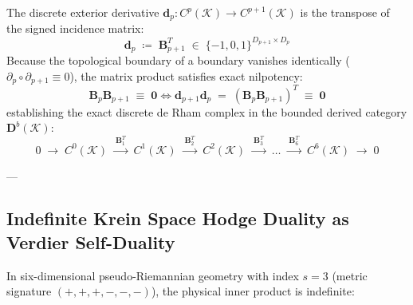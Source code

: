 \documentclass[
    12pt,
    a4paper,
    headings=normal,
    twoside=false,
    open=any,
    parskip=half
]{scrbook}
\begin{document}
The discrete exterior derivative $\mathbf{d}_p \colon C^p(\mathcal{K}) \to C^{p+1}(\mathcal{K})$ is the transpose of the signed incidence matrix:
\begin{equation}
\mathbf{d}_p \;\coloneqq\; \mathbf{B}_{p+1}^T \;\in\; \{-1, 0, 1\}^{D_{p+1} \times D_p}
\label{eq:ch1_discrete_derivative_incidence}
\end{equation}
Because the topological boundary of a boundary vanishes identically ($\partial_p \circ \partial_{p+1} \equiv 0$), the matrix product satisfies exact nilpotency:
\begin{equation}
\mathbf{B}_p \mathbf{B}_{p+1} \;\equiv\; \mathbf{0} \iff \mathbf{d}_{p+1} \mathbf{d}_p \;=\; \left( \mathbf{B}_p \mathbf{B}_{p+1} \right)^T \;\equiv\; \mathbf{0}
\label{eq:ch1_nilpotency_matrix_proof}
\end{equation}
establishing the exact discrete de Rham complex in the bounded derived category $\mathbf{D}^b(\mathcal{K})$:
\begin{equation}
0 \;\longrightarrow\; C^0(\mathcal{K}) \;\xrightarrow{\ \mathbf{B}_1^T\ }\; C^1(\mathcal{K}) \;\xrightarrow{\ \mathbf{B}_2^T\ }\; C^2(\mathcal{K}) \;\xrightarrow{\ \mathbf{B}_3^T\ }\; \dots \;\xrightarrow{\ \mathbf{B}_6^T\ }\; C^6(\mathcal{K}) \;\longrightarrow\; 0
\label{eq:ch1_discrete_cochain_complex}
\end{equation}

---

\subsection{Indefinite Krein Space Hodge Duality as Verdier Self-Duality}

In six-dimensional pseudo-Riemannian geometry with index $s = 3$ (metric signature $(+,+,+,-,-,-)$), the physical inner product is indefinite:
\end{document}
